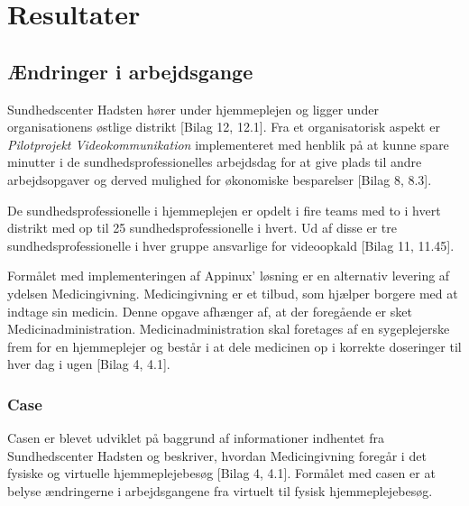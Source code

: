 \section{Resultater}
\subsection{Ændringer i arbejdsgange}\label{sec:arbejdsgange}
Sundhedscenter Hadsten hører under hjemmeplejen og ligger under organisationens østlige distrikt [Bilag 12, 12.1]. Fra et organisatorisk aspekt er \textit{Pilotprojekt Videokommunikation} implementeret med henblik på at kunne spare minutter i de sundhedsprofessionelles arbejdsdag for at give plads til andre arbejdsopgaver og derved mulighed for økonomiske besparelser [Bilag 8, 8.3]. 

De sundhedsprofessionelle i hjemmeplejen er opdelt i fire teams med to i hvert distrikt med op til 25 sundhedsprofessionelle i hvert. Ud af disse er tre sundhedsprofessionelle i hver gruppe ansvarlige for videoopkald [Bilag 11, 11.45].

Formålet med implementeringen af Appinux’ løsning er en alternativ levering af ydelsen Medicingivning. Medicingivning er et tilbud, som hjælper borgere med at indtage sin medicin. Denne opgave afhænger af, at der foregående er sket Medicinadministration. Medicinadministration skal foretages af en sygeplejerske frem for en hjemmeplejer og består i at dele medicinen op i korrekte doseringer til hver dag i ugen [Bilag 4, 4.1].


\subsubsection{Case}
Casen er blevet udviklet på baggrund af informationer indhentet fra Sundhedscenter Hadsten og beskriver, hvordan Medicingivning foregår i det fysiske og virtuelle hjemmeplejebesøg [Bilag 4, 4.1].
Formålet med casen er at belyse ændringerne i arbejdsgangene fra virtuelt til fysisk hjemmeplejebesøg.

